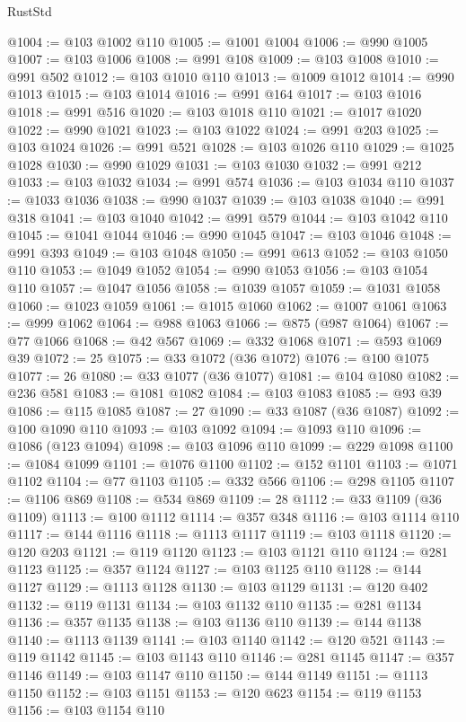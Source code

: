 \begin{lexlean}{RustStd}
\begin{coremodule}
@1004 := @103 @1002 @110
@1005 := @1001 @1004
@1006 := @990 @1005
@1007 := @103 @1006
@1008 := @991 @108
@1009 := @103 @1008
@1010 := @991 @502
@1012 := @103 @1010 @110
@1013 := @1009 @1012
@1014 := @990 @1013
@1015 := @103 @1014
@1016 := @991 @164
@1017 := @103 @1016
@1018 := @991 @516
@1020 := @103 @1018 @110
@1021 := @1017 @1020
@1022 := @990 @1021
@1023 := @103 @1022
@1024 := @991 @203
@1025 := @103 @1024
@1026 := @991 @521
@1028 := @103 @1026 @110
@1029 := @1025 @1028
@1030 := @990 @1029
@1031 := @103 @1030
@1032 := @991 @212
@1033 := @103 @1032
@1034 := @991 @574
@1036 := @103 @1034 @110
@1037 := @1033 @1036
@1038 := @990 @1037
@1039 := @103 @1038
@1040 := @991 @318
@1041 := @103 @1040
@1042 := @991 @579
@1044 := @103 @1042 @110
@1045 := @1041 @1044
@1046 := @990 @1045
@1047 := @103 @1046
@1048 := @991 @393
@1049 := @103 @1048
@1050 := @991 @613
@1052 := @103 @1050 @110
@1053 := @1049 @1052
@1054 := @990 @1053
@1056 := @103 @1054 @110
@1057 := @1047 @1056
@1058 := @1039 @1057
@1059 := @1031 @1058
@1060 := @1023 @1059
@1061 := @1015 @1060
@1062 := @1007 @1061
@1063 := @999 @1062
@1064 := @988 @1063
@1066 := @875 (@987 @1064)
@1067 := @77 @1066
@1068 := @42 @567
@1069 := @332 @1068
@1071 := @593 @1069 @39
@1072 := 25
@1075 := @33 @1072 (@36 @1072)
@1076 := @100 @1075
@1077 := 26
@1080 := @33 @1077 (@36 @1077)
@1081 := @104 @1080
@1082 := @236 @581
@1083 := @1081 @1082
@1084 := @103 @1083
@1085 := @93 @39
@1086 := @115 @1085
@1087 := 27
@1090 := @33 @1087 (@36 @1087)
@1092 := @100 @1090 @110
@1093 := @103 @1092
@1094 := @1093 @110
@1096 := @1086 (@123 @1094)
@1098 := @103 @1096 @110
@1099 := @229 @1098
@1100 := @1084 @1099
@1101 := @1076 @1100
@1102 := @152 @1101
@1103 := @1071 @1102
@1104 := @77 @1103
@1105 := @332 @566
@1106 := @298 @1105
@1107 := @1106 @869
@1108 := @534 @869
@1109 := 28
@1112 := @33 @1109 (@36 @1109)
@1113 := @100 @1112
@1114 := @357 @348
@1116 := @103 @1114 @110
@1117 := @144 @1116
@1118 := @1113 @1117
@1119 := @103 @1118
@1120 := @120 @203
@1121 := @119 @1120
@1123 := @103 @1121 @110
@1124 := @281 @1123
@1125 := @357 @1124
@1127 := @103 @1125 @110
@1128 := @144 @1127
@1129 := @1113 @1128
@1130 := @103 @1129
@1131 := @120 @402
@1132 := @119 @1131
@1134 := @103 @1132 @110
@1135 := @281 @1134
@1136 := @357 @1135
@1138 := @103 @1136 @110
@1139 := @144 @1138
@1140 := @1113 @1139
@1141 := @103 @1140
@1142 := @120 @521
@1143 := @119 @1142
@1145 := @103 @1143 @110
@1146 := @281 @1145
@1147 := @357 @1146
@1149 := @103 @1147 @110
@1150 := @144 @1149
@1151 := @1113 @1150
@1152 := @103 @1151
@1153 := @120 @623
@1154 := @119 @1153
@1156 := @103 @1154 @110

\end{coremodule}
\end{lexlean}
